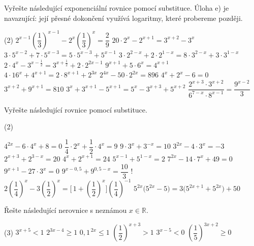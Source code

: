 \documentclass[12pt,a4paper]{article}
\begin{document}
\begin{exercise}
Vyřešte následující exponenciální rovnice pomocí substituce.
Úloha e) je navazující: její přesné dokončení využívá logaritmy, které probereme později.

\begin{tasks}(2)
    \task $2^{x-1}\left(\dfrac{1}{3}\right)^{x-1} - 2^{x}\left(\dfrac{1}{3}\right)^{x} = \dfrac{2}{9}$
    \task $20 \cdot 2^{x} - 2^{x+1} = 3^{x+2} - 3^{x}$
    \task $3 \cdot 5^{x-2} + 7 \cdot 5^{x-3} = 5 \cdot 5^{x-3} + 5^{x-1}$
    \task $3 \cdot 2^{2-x} + 2 \cdot 2^{1-x} = 8 \cdot 3^{2-x} + 3 \cdot 3^{1-x}$
    \task $2 \cdot 4^{x} - 3^{x-\tfrac12} = 3^{x+\tfrac12} + 2 \cdot 2^{2x-1}$
    \task $9^{x+1} + 5 \cdot 6^{x} = 4^{x+1}$
    \task $4 \cdot 16^{x} + 4^{x+1} = 2 \cdot 8^{x+1} + 2^{3x}$
    \task $2^{4x} - 50 \cdot 2^{2x} = 896$
    \task $4^x + 2^x - 6 = 0$
    \task $3^{x+2} + 9^{x+1} = 810$
    \task $3^x + 3^{x+1} - 5^{x+1} = 5^x - 3^{x+3} + 5^{x+2}$
    \task $\dfrac{2^{x+3} \cdot 3^{x+2}}{6^{7-x} \cdot 8^{x-1}} = \dfrac{9^{x-2}}{3}$
\end{tasks}

\end{exercise}


\begin{exercise}
Vyřešte následující rovnice pomocí substituce.
\begin{tasks}(2)

    \task $4^{2x} - 6 \cdot 4^{x} + 8 = 0$
    \task \(\dfrac{1}{4} \cdot 2^{x} + \dfrac{1}{2} \cdot 4^{x} = 9\)
    \task $9 \cdot 3^{x} + 3^{-x} = 10$
    \task $3^{2x} - 4 \cdot 3^{x} = -3$
    \task $2^{x+3} + 2^{3-x} = 20$
    \task $4^{x} + 2^{x+1} = 24$
    \task $5^{x-1} + 5^{1-x} = 2$
    \task $7^{2x} - 14 \cdot 7^{x} + 49 = 0$
    \task $9^{x+1} - 27 \cdot 3^{x} = 0$    
    \task $9^{x-0{,}5} + 9^{0{,}5-x} = \dfrac{10}{3}$
    \task! $2\left(\dfrac{1}{4}\right)^{x}
           - 3\left(\dfrac{1}{2}\right)^{x}
           = \bigl[\,1 + \left(\dfrac{1}{2}\right)^{x}\bigr]
             \left(\dfrac{1}{4}\right)^{-1}$
    \task $5^{2x}\bigl(5^{2x} - 5\bigr)
           = 3\bigl(5^{2x+1} + 5^{2x}\bigr) + 50$
\end{tasks}
\end{exercise}


\setcounter{section}{2}
\begin{exercise}
Řešte následující nerovnice s neznámou $x \in \mathbb{R}$.

\begin{tasks}(3)
    \task $3^{x+5} < 1$
    \task $2^{3x-4} \ge 1$
    \task  $0{,}1^{\,2x} \le 1$
    \task $\left(\dfrac{1}{2}\right)^{x+3} > 1$
    \task $3^{x-5} < 0$
    \task $\left(\dfrac{1}{5}\right)^{3x+2} \ge 0$
\end{tasks}

\end{exercise}
\end{document}

